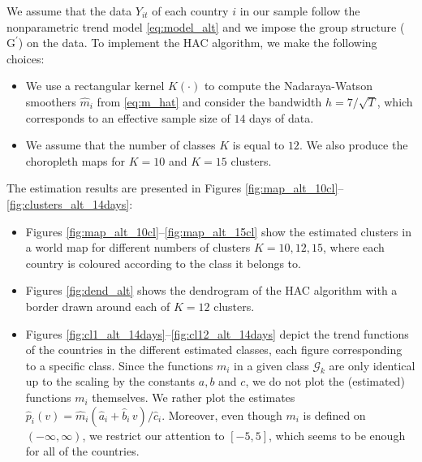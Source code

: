 \documentclass[a4paper,12pt]{article}
\numberwithin{equation}{section}
\begin{document}
We assume that the data $Y_{it}$ of each country $i$ in our sample follow the nonparametric trend model \eqref{eq:model_alt}
and we impose the group structure ($\text{G}^\prime$) on the data. 
To implement the HAC algorithm, we make the following choices:
\begin{itemize}[leftmargin=0.6cm]
\item We use a rectangular kernel $K(\cdot)$ to compute the Nadaraya-Watson smoothers $\hat{m}_{i}$ from \eqref{eq:m_hat} and consider the bandwidth $h = 7/\sqrt{T}$, which corresponds to an effective sample size of $14$ days of data. 
\item We assume that the number of classes $K$ is equal to $12$. We also produce the choropleth maps for $K=10$ and $K = 15$ clusters.
\end{itemize}
The estimation results are presented in Figures \ref{fig:map_alt_10cl}--\ref{fig:clusters_alt_14days}:
\begin{itemize}[leftmargin=0.6cm]
\item Figures \ref{fig:map_alt_10cl}--\ref{fig:map_alt_15cl} show the estimated clusters in a world map for different numbers of clusters $K =10, 12, 15$, where each country is coloured according to the class it belongs to. 
\item Figures \ref{fig:dend_alt} shows the dendrogram of the HAC algorithm with a border drawn around each of $K = 12$ clusters.
\item Figures \ref{fig:cl1_alt_14days}--\ref{fig:cl12_alt_14days} depict the trend functions of the countries in the different estimated classes, each figure corresponding to a specific class. Since the functions $m_i$ in a given class $\mathcal{G}_k$ are only identical up to the scaling by the constants $a, b$ and $c$, we do not plot the (estimated) functions $m_i$ themselves. We rather plot the estimates $\hat{p}_i(v) = \hat{m}_i(\hat{a}_i + \hat{b}_i \, v)/\hat{c}_i$. Moreover, even though $m_i$ is defined on $(-\infty, \infty)$, we restrict our attention to $[-5, 5]$, which seems to be enough for all of the countries.
\end{itemize}
\end{document}
